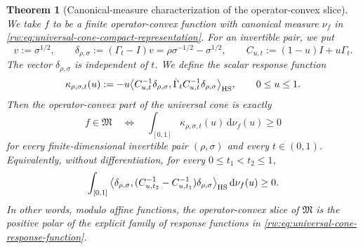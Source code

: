 \documentclass[11pt]{article}
\newtheorem{theorem}[theorem]{Theorem}
\theoremstyle{remark}
\newcommand{\1}{\mathbbm{1}}
\begin{document}
\begin{theorem}[Canonical-measure characterization of the
operator-convex slice]
\label{rw:thm:universal-cone-measure-characterization}
We take \(f\) to be a finite operator-convex function with canonical measure
\(\nu_f\) in
\eqref{rw:eq:universal-cone-compact-representation}.  For an invertible
pair, we put
\begin{equation}
 v:=\sigma^{1/2},
 \qquad
 \delta_{\rho,\sigma}:=(\Gamma_t-I)v
 =\rho\sigma^{-1/2}-\sigma^{1/2},
 \qquad
 C_{u,t}:=(1-u)I+u\Gamma_t.
 \label{rw:eq:universal-cone-response-data}
\end{equation}
The vector \(\delta_{\rho,\sigma}\) is independent of \(t\).  We define
the scalar response function
\begin{equation}
 \kappa_{\rho,\sigma,t}(u)
 :=-u\big\langle C_{u,t}^{-1}\delta_{\rho,\sigma},
 \dot\Gamma_t C_{u,t}^{-1}\delta_{\rho,\sigma}
 \big\rangle_{\rm HS},
 \qquad 0\leq u\leq1.
 \label{rw:eq:universal-cone-response-function}
\end{equation}
Then the operator-convex part of the universal cone is exactly
\begin{equation}
 \boxed{
 f\in\mathfrak M
 \quad\Longleftrightarrow\quad
 \int_{[0,1]}\kappa_{\rho,\sigma,t}(u)\,
 \mathrm d\nu_f(u)\geq0
 }
 \label{rw:eq:universal-cone-measure-polar}
\end{equation}
for every finite-dimensional invertible pair \((\rho,\sigma)\) and
every \(t\in(0,1)\).  Equivalently, without differentiation, for
every \(0\leq t_1<t_2\leq1\),
\begin{equation}
 \int_{[0,1]}
 \big\langle\delta_{\rho,\sigma},
 (C_{u,t_2}^{-1}-C_{u,t_1}^{-1})
 \delta_{\rho,\sigma}\big\rangle_{\rm HS}
 \,\mathrm d\nu_f(u)\geq0.
 \label{rw:eq:universal-cone-measure-finite-difference}
\end{equation}
In other words, modulo affine functions, the operator-convex slice of
\(\mathfrak M\) is the positive polar of the explicit family of
response functions in
\eqref{rw:eq:universal-cone-response-function}.
\end{theorem}
\end{document}

